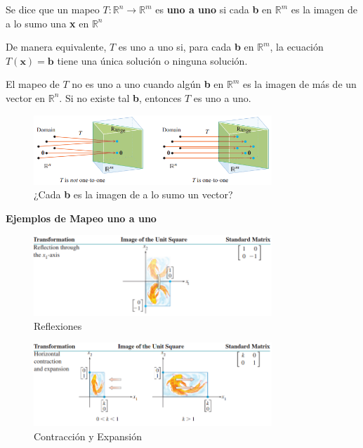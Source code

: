 \documentclass{article}
\begin{document}
\begin{tcolorbox}[colback=blue!10!white,colframe=blue!60!black,title=Unicidad]
    Se dice que un mapeo $T: \mathbb{R}^n \rightarrow \mathbb{R}^m$  es \textbf{uno a uno} si cada \textbf{b} en $\mathbb{R}^m$ es la imagen de a lo sumo una \textbf{x} en $\mathbb{R}^n$
\end{tcolorbox}

De manera equivalente, $T$ es uno a uno si, para cada \textbf{b} en $\mathbb{R}^m$, la ecuación $T(\mathbf{x}) = \mathbf{b}$ tiene una única solución o ninguna solución.

El mapeo de $T$ no es uno a uno cuando algún \textbf{b} en $\mathbb{R}^m$ es la imagen de más de un vector en $\mathbb{R}^n$. Si no existe tal \textbf{b}, entonces $T$ es uno a uno.

\begin{figure}[ht]
  \centerline{\includegraphics[width=0.8\textwidth]{image23.png}}
  \caption{¿Cada \textbf{b} es la imagen de a lo sumo un vector?}
\end{figure}

\pagebreak

\begin{large}
    \textbf{Ejemplos de Mapeo uno a uno}
\end{large}

\begin{figure}[ht]
  \centerline{\includegraphics[width=0.8\textwidth]{image24.png}}
  \caption{Reflexiones}
\end{figure}

\begin{figure}[ht]
    \centerline{\includegraphics[width=0.8\textwidth]{image25.png}}
    \caption{Contracción y Expansión}
\end{figure}
\end{document}
